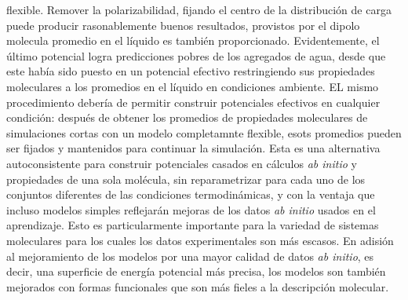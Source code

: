 flexible. Remover la polarizabilidad, fijando el centro de la 
distribuci\'on de carga puede producir rasonablemente buenos 
resultados, provistos por el dipolo molecula promedio en el l\'iquido
es tambi\'en proporcionado. Evidentemente, el \'ultimo potencial 
logra predicciones pobres de los agregados de agua, desde que este
hab\'ia sido puesto en un potencial efectivo restringiendo sus 
propiedades moleculares a los promedios en el l\'iquido en 
condiciones ambiente. EL mismo procedimiento deber\'ia de permitir
construir potenciales efectivos en cualquier condici\'on: despu\'es
de obtener los promedios de propiedades moleculares de simulaciones
cortas con un modelo completamnte flexible, esots promedios pueden 
ser fijados y mantenidos para continuar la simulaci\'on. Esta es una
alternativa autoconsistente para construir potenciales casados en 
c\'alculos {\it ab initio} y propiedades de una sola mol\'ecula, sin 
reparametrizar para cada uno de los conjuntos diferentes de las
condiciones termodin\'amicas, y con la ventaja que incluso modelos
simples reflejar\'an mejoras de los datos {\it ab initio} usados en
el aprendizaje. Esto es particularmente importante para la variedad
de sistemas moleculares para los cuales los datos experimentales son
m\'as escasos.
En adisi\'on al mejoramiento de los modelos por una mayor calidad de
datos {\it ab initio}, es decir, una superficie de energ\'ia 
potencial m\'as precisa, los modelos son tambi\'en mejorados con 
formas funcionales que son m\'as fieles a la descripci\'on molecular.
